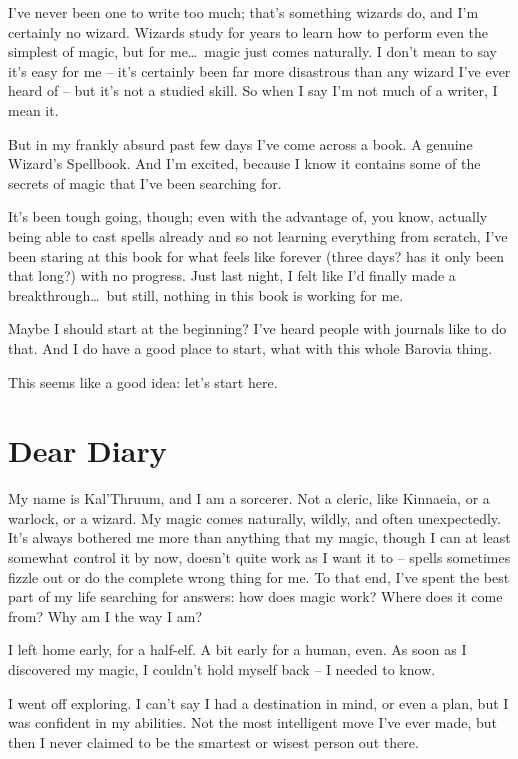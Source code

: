 I've never been one to write too much; that's something wizards do, and I'm certainly no wizard. Wizards study for years to learn how to perform even the simplest of magic, but for me\dots\ magic just comes naturally. I don't mean to say it's easy for me -- it's certainly been far more disastrous than any wizard I've ever heard of -- but it's not a studied skill. So when I say I'm not much of a writer, I mean it.

But in my frankly absurd past few days I've come across a book. A genuine Wizard's Spellbook. And I'm excited, because I know it contains some of the secrets of magic that I've been searching for.

It's been tough going, though; even with the advantage of, you know, actually being able to cast spells already and so not learning everything from scratch, I've been staring at this book for what feels like forever (three days? has it only been that long?) with no progress. Just last night, I felt like I'd finally made a breakthrough\dots\ but still, nothing in this book is working for me.

Maybe I should start at the beginning? I've heard people with journals like to do that. And I do have a good place to start, what with this whole Barovia thing.

This seems like a good idea: let's start here.

\section*{Dear Diary}
My name is Kal'Thruum, and I am a sorcerer. Not a cleric, like Kinnaeia, or a warlock, or a wizard. My magic comes naturally, wildly, and often unexpectedly. It's always bothered me more than anything that my magic, though I can at least somewhat control it by now, doesn't quite work as I want it to -- spells sometimes fizzle out or do the complete wrong thing for me. To that end, I've spent the best part of my life searching for answers: how does magic work? Where does it come from? Why am I the way I am?

I left home early, for a half-elf. A bit early for a human, even. As soon as I discovered my magic, I couldn't hold myself back -- I needed to know.

I went off exploring. I can't say I had a destination in mind, or even a plan, but I was confident in my abilities. Not the most intelligent move I've ever made, but then I never claimed to be the smartest or wisest person out there.

